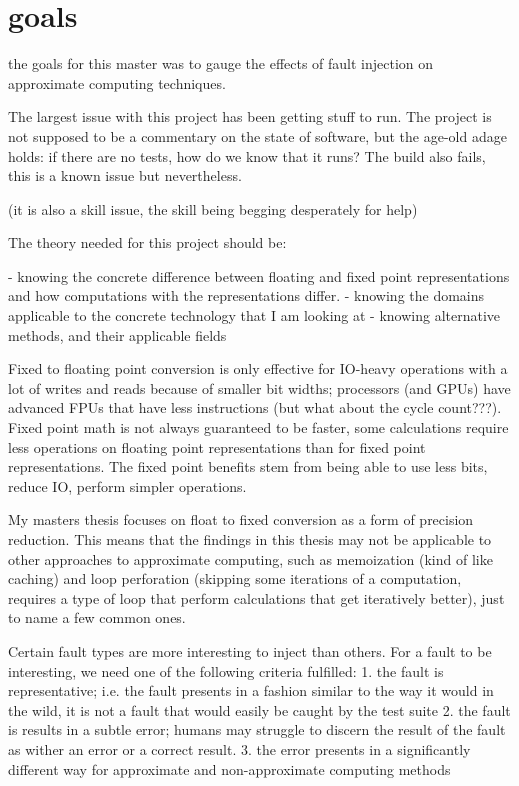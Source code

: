 \section{goals}

the goals for this master was to gauge the effects of fault injection on approximate computing techniques.

The largest issue with this project has been getting stuff to run. The project is not supposed to be a commentary on the state of software, but the age-old adage holds: if there are no tests, how do we know that it runs? The build also fails, this is a known issue but nevertheless.

(it is also a skill issue, the skill being begging desperately for help)

The theory needed for this project should be:

- knowing the concrete difference between floating and fixed point representations and how computations with the representations differ.
- knowing the domains applicable to the concrete technology that I am looking at
- knowing alternative methods, and their applicable fields





Fixed to floating point conversion is only effective for IO-heavy operations with a lot of writes and reads because of smaller bit widths; processors (and GPUs) have advanced FPUs that have less instructions (but what about the cycle count???). Fixed point math is not always guaranteed to be faster, some calculations require less operations on floating point representations than for fixed point representations. The fixed point benefits stem from being able to use less bits, reduce IO, perform simpler operations.

My masters thesis focuses on float to fixed conversion as a form of precision reduction. This means that the findings in this thesis may not be applicable to other approaches to approximate computing, such as memoization (kind of like caching) and loop perforation (skipping some iterations of a computation, requires a type of loop that perform calculations that get iteratively better), just to name a few common ones. 

Certain fault types are more interesting to inject than others. For a fault to be interesting, we need one of the following criteria fulfilled:
1. the fault is representative; i.e. the fault presents in a fashion similar to the way it would in the wild, it is not a fault that would easily be caught by the test suite
2. the fault is results in a subtle error; humans may struggle to discern the result of the fault as wither an error or a correct result. 
3. the error presents in a significantly different way for approximate and non-approximate computing methods